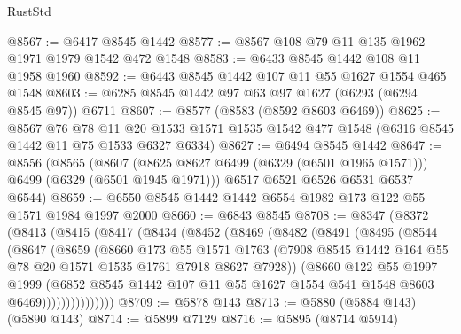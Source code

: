 \begin{lexlean}{RustStd}
\begin{coremodule}
{{@8567 := @6417 @8545 @1442
@8577 := @8567 @108 @79 @11 @135 @1962 @1971 @1979 @1542 @472 @1548
@8583 := @6433 @8545 @1442 @108 @11 @1958 @1960
@8592 := @6443 @8545 @1442 @107 @11 @55 @1627 @1554 @465 @1548
@8603 := @6285 @8545 @1442 @97 @63 @97 @1627 (@6293 (@6294 @8545 @97)) @6711
@8607 := @8577 (@8583 (@8592 @8603 @6469))
@8625 := @8567
    @76
    @78
    @11
    @20
    @1533
    @1571
    @1535
    @1542
    @477
    @1548
    (@6316 @8545 @1442 @11 @75 @1533 @6327 @6334)
@8627 := @6494 @8545 @1442
@8647 := @8556
    (@8565
      (@8607 (@8625 @8627 @6499 (@6329 (@6501 @1965 @1571))) @6499 (@6329 (@6501 @1945 @1971)))
      @6517
      @6521
      @6526
      @6531
      @6537
      @6544)
@8659 := @6550 @8545 @1442 @1442 @6554 @1982 @173 @122 @55 @1571 @1984 @1997 @2000
@8660 := @6843 @8545
@8708 := @8347
    (@8372
      (@8413
        (@8415
          (@8417
            (@8434
              (@8452
                (@8469
                  (@8482
                    (@8491
                      (@8495
                        (@8544
                          (@8647
                            (@8659
                              (@8660
                                @173
                                @55
                                @1571
                                @1763
                                (@7908
                                  @8545
                                  @1442
                                  @164
                                  @55
                                  @78
                                  @20
                                  @1571
                                  @1535
                                  @1761
                                  @7918
                                  @8627
                                  @7928))
                              (@8660
                                @122
                                @55
                                @1997
                                @1999
                                (@6852
                                  @8545
                                  @1442
                                  @107
                                  @11
                                  @55
                                  @1627
                                  @1554
                                  @541
                                  @1548
                                  @8603
                                  @6469)))))))))))))))
@8709 := @5878 @143
@8713 := @5880 (@5884 @143) (@5890 @143)
@8714 := @5899 @7129
@8716 := @5895 (@8714 @5914)
}}
\end{coremodule}
\end{lexlean}
